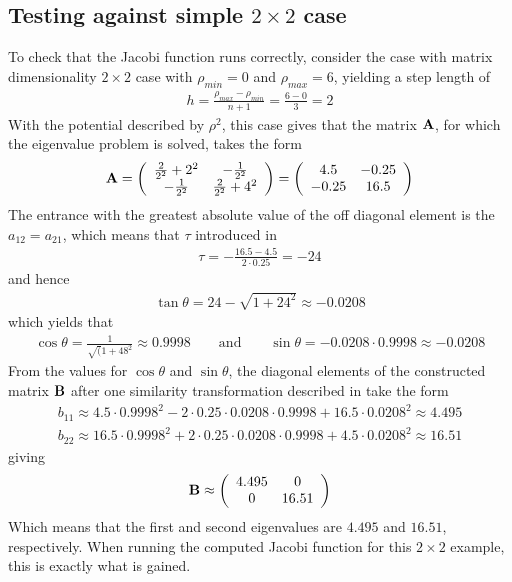\subsection{Testing against simple $2\times 2$ case}
\label{subsec:simplecase}
To check that the Jacobi function runs correctly, consider the case with matrix dimensionality $2\times 2$ case with $\rho_{min} = 0$ and $\rho_{max} = 6$, yielding a step length of
\begin{align*}
	h = \frac{\rho_{max}-\rho_{min}}{n+1} = \frac{6-0}{3} = 2
\end{align*}
With the potential described by $\rho^2$, this case gives that the matrix $\mbox{\textbf{A}}$, for which the eigenvalue problem is solved, takes the form
\begin{align*}
	\mbox{\textbf{A}} =
	\left(
	\begin{array}{cc}
		\frac{2}{2^2}+2^2	& 	-\frac{1}{2^2}
		\\
		-\frac{1}{2^2}		&	\frac{2}{2^2}+4^2
	\end{array}
	\right)
	=
	\left(
	\begin{array}{cc}
		4.5	& 	-0.25
		\\
		-0.25		&	16.5
	\end{array}
	\right)
\end{align*}
The entrance with the greatest absolute value of the off diagonal element is the $a_{12} = a_{21}$, which means that $\tau$ introduced in  
\begin{align*}
	\tau = -\frac{16.5-4.5}{2\cdot 0.25} = -24
\end{align*}
and hence
\begin{align*}
	\tan\theta = 24 - \sqrt{1+24^2} \approx -0.0208
\end{align*}
which yields that
\begin{align}
	\cos\theta = \frac{1}{\sqrt(1+48^2} \approx  0.9998
	\qquad
	\text{and}
	\qquad
	\sin\theta = -0.0208\cdot 0.9998 \approx -0.0208
\end{align}
From the values for $\cos\theta$ and $\sin\theta$, the diagonal elements of the constructed matrix $\mbox{\textbf{B}}$ after one similarity transformation described in  take the form
\begin{align*}
 	b_{11} \approx 4.5\cdot 0.9998^2 - 2\cdot 0.25 \cdot 0.0208 \cdot 0.9998 + 16.5\cdot 0.0208^2 \approx 4.495
 	\\
 	b_{22} \approx 16.5\cdot 0.9998^2 + 2\cdot 0.25 \cdot 0.0208 \cdot 0.9998 + 4.5\cdot 0.0208^2 \approx 16.51
\end{align*}
giving
\begin{align*}
	\mbox{\textbf{B}}
	\approx
	\left(
	\begin{array}{cc}
		4.495	&	0
		\\
		0	&	16.51
	\end{array}
	\right)
\end{align*}  
Which means that the first and second eigenvalues are $4.495$ and $16.51$, respectively.
When running the computed Jacobi function for this $2\times 2$ example, this is exactly what is gained.
